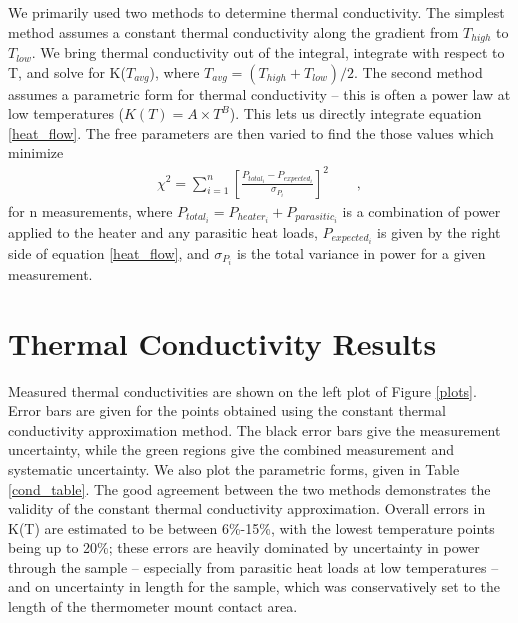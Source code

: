 \documentclass[final]{svjour2}
\begin{document}
We primarily used two methods to determine thermal conductivity. The simplest method assumes a constant thermal conductivity\footnotemark {} along the gradient from $T_{high}$ to $T_{low}$. We bring thermal conductivity out of the integral, integrate with respect to T, and solve for K($T_{avg}$), where $T_{avg} = (T_{high} + T_{low})/2$. The second method assumes a parametric form for thermal conductivity -- this is often a power law at low temperatures ($K(T) = A \times T^B$). This lets us directly integrate equation \ref{heat_flow}. The free parameters are then varied to find the those values which minimize
\begin{eqnarray}
\chi^2 = \sum_{i = 1}^{n} \left[\frac{P_{total_i} - P_{expected_i}}{\sigma_{P_i}}\right]^2 \qquad ,
\label{param}
\end{eqnarray}
for n measurements, where $P_{total_i} = P_{heater_i} + P_{parasitic_i}$ is a combination of power applied to the heater and any parasitic heat loads, $P_{expected_i}$ is given by the right side of equation \ref{heat_flow}, and $\sigma_{P_i}$ is the total variance in power for a given measurement.

\section{Thermal Conductivity Results}
Measured thermal conductivities are shown on the left plot of Figure \ref{plots}. Error bars are given for the points obtained using the constant thermal conductivity approximation method. The black error bars give the measurement uncertainty, while the green regions give the combined measurement and systematic uncertainty. We also plot the parametric forms, given in Table \ref{cond_table}. The good agreement between the two methods demonstrates the validity of the constant thermal conductivity approximation. Overall errors in K(T) are estimated to be between 6\%-15\%, with the lowest temperature points being up to 20\%; these errors are heavily dominated by uncertainty in power through the sample -- especially from parasitic heat loads at low temperatures -- and on uncertainty in length for the sample, which was conservatively set to the length of the thermometer mount contact area.
\end{document}
